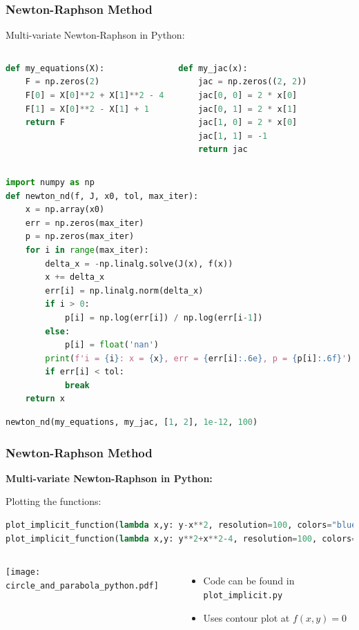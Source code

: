   
  \begin{frame}[fragile]
    \frametitle{Newton-Raphson Method}
    
    Multi-variate Newton-Raphson in Python:
    \begin{columns}
      \begin{lstlisting}[language=Python, basicstyle=\tiny]
def my_equations(X):
    F = np.zeros(2)
    F[0] = X[0]**2 + X[1]**2 - 4
    F[1] = X[0]**2 - X[1] + 1
    return F
      \end{lstlisting}
      \begin{lstlisting}[language=Python, basicstyle=\tiny]
def my_jac(x):
    jac = np.zeros((2, 2))
    jac[0, 0] = 2 * x[0]
    jac[0, 1] = 2 * x[1]
    jac[1, 0] = 2 * x[0]
    jac[1, 1] = -1
    return jac
      \end{lstlisting}
    \end{columns}
    \begin{lstlisting}[language=Python, basicstyle=\tiny]
import numpy as np
def newton_nd(f, J, x0, tol, max_iter):
    x = np.array(x0)
    err = np.zeros(max_iter)
    p = np.zeros(max_iter)
    for i in range(max_iter):
        delta_x = -np.linalg.solve(J(x), f(x))
        x += delta_x
        err[i] = np.linalg.norm(delta_x)
        if i > 0:
            p[i] = np.log(err[i]) / np.log(err[i-1])
        else:
            p[i] = float('nan')
        print(f'i = {i}: x = {x}, err = {err[i]:.6e}, p = {p[i]:.6f}')
        if err[i] < tol:
            break
    return x
    \end{lstlisting}
    \begin{lstlisting}[language=Python]
newton_nd(my_equations, my_jac, [1, 2], 1e-12, 100)
    \end{lstlisting}
\end{frame}


  \begin{frame}[fragile]
    \frametitle{Newton-Raphson Method}
  
    \textbf{Multi-variate Newton-Raphson in Python:}
    
    Plotting the functions:
    \begin{lstlisting}[language=Python]
plot_implicit_function(lambda x,y: y-x**2, resolution=100, colors="blue")
plot_implicit_function(lambda x,y: y**2+x**2-4, resolution=100, colors="red")
    \end{lstlisting}
    \begin{columns}
      \texttt{[image: circle\_and\_parabola\_python.pdf]}
      \begin{itemize}
        \item Code can be found in \lstinline[language=Python]{plot_implicit.py}
        \item Uses contour plot at $f(x,y)=0$
      \end{itemize}
    \end{columns}
  \end{frame}

